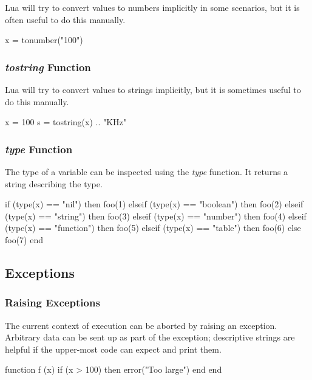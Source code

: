 \documentclass[11pt]{article}
\newcommand{\func}[1]{\mbox{\itshape#1}}
\begin{document}
Lua will try to convert values to numbers implicitly in some scenarios, but it
is often useful to do this manually.

\begin{LuaCode}
x = tonumber("100")
\end{LuaCode}

\subsubsection{\func{tostring} Function}

Lua will try to convert values to strings implicitly, but it is sometimes
useful to do this manually.

\begin{LuaCode}
x = 100
s = tostring(x) .. "KHz"
\end{LuaCode}

\subsubsection{\func{type} Function}

The type of a variable can be inspected using the \func{type} function.  It returns a
string describing the type.

\begin{LuaCode}
if (type(x) == "nil") then
	foo(1)
elseif (type(x) == "boolean") then
	foo(2)
elseif (type(x) == "string") then
	foo(3)
elseif (type(x) == "number") then
	foo(4)
elseif (type(x) == "function") then
	foo(5)
elseif (type(x) == "table") then
	foo(6)
else
	foo(7)
end
\end{LuaCode}

\subsection{Exceptions}

\subsubsection{Raising Exceptions}

The current context of execution can be aborted by raising an exception.
Arbitrary data can be sent up as part of the exception; descriptive strings are
helpful if the upper-most code can expect and print them.

\begin{LuaCode}
function f (x)
	if (x > 100) then
		error("Too large")
	end
end
\end{LuaCode}
\end{document}
